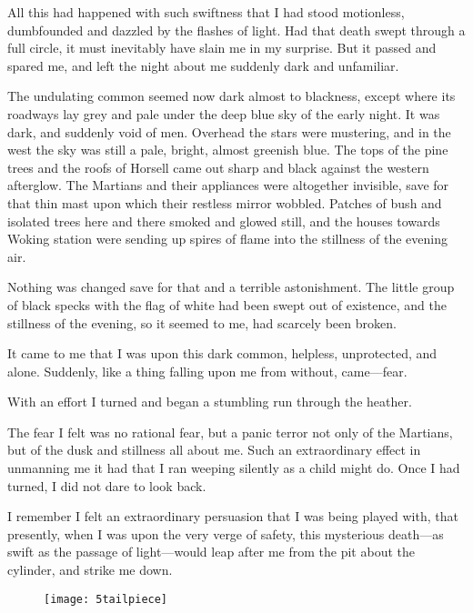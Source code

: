All this had happened with such swiftness that I had stood motionless, dumbfounded and dazzled by the flashes of light. Had that death swept through a full circle, it must inevitably have slain me in my surprise. But it passed and spared me, and left the night about me suddenly dark and unfamiliar.

The undulating common seemed now dark almost to blackness, except where its roadways lay grey and pale under the deep blue sky of the early night. It was dark, and suddenly void of men. Overhead the stars were mustering, and in the west the sky was still a pale, bright, almost greenish blue. The tops of the pine trees and the roofs of Horsell came out sharp and black against the western afterglow. The Martians and their appliances were altogether invisible, save for that thin mast upon which their restless mirror wobbled. Patches of bush and isolated trees here and there smoked and glowed still, and the houses towards Woking station were sending up spires of flame into the stillness of the evening air.

Nothing was changed save for that and a terrible astonishment. The little group of black specks with the flag of white had been swept out of existence, and the stillness of the evening, so it seemed to me, had scarcely been broken.

It came to me that I was upon this dark common, helpless, unprotected, and alone. Suddenly, like a thing falling upon me from without, came—fear.

With an effort I turned and began a stumbling run through the heather.

The fear I felt was no rational fear, but a panic terror not only of the Martians, but of the dusk and stillness all about me. Such an extraordinary effect in unmanning me it had that I ran weeping silently as a child might do. Once I had turned, I did not dare to look back.

I remember I felt an extraordinary persuasion that I was being played with, that presently, when I was upon the very verge of safety, this mysterious death—as swift as the passage of light—would leap after me from the pit about the cylinder, and strike me down.

\begin{figure}[b!]
\centering
\texttt{[image: 5tailpiece]}
\end{figure}